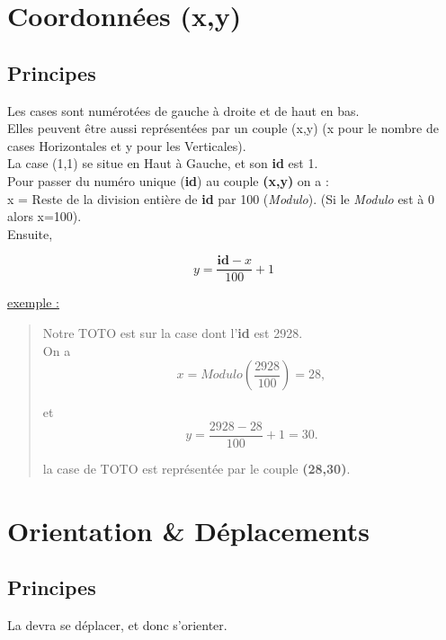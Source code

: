 \documentclass[french]{report}
\newlength{\du}\fi
\begin{document}
\section{Coordonnées (x,y)}\label{coordonnees}

\subsection{Principes}
Les cases sont numérotées de gauche à droite et de haut en bas.\\

Elles peuvent être aussi représentées par un couple (x,y) (x pour le nombre de cases Horizontales et y pour les Verticales).\\
La case (1,1) se situe en Haut à Gauche, et son \textbf{id} est 1.\\

Pour passer du numéro unique (\textbf{id}) au couple \textbf{(x,y)} on a :\\

x = Reste de la division entière de \textbf{id} par 100 (\textit{Modulo}). (Si le \textit{Modulo} est à 0 alors  x=100).\\

Ensuite,

\begin{equation}
y = \frac{\textbf{id} - x}{100} + 1
\end{equation}

\underline{exemple :} \\
\begin{quote}
	Notre \CoCiX TOTO est sur la case dont l'\textbf{id} est 2928.\\
	
	On a \[ x = Modulo(\frac{2928}{100}) = 28,\]
	
	et \[ y =  \frac{2928 - 28}{100} + 1  = 30.\]
	
	la case de TOTO est représentée par le couple \textbf{(28,30)}.
	
\end{quote}

\section{Orientation \& Déplacements}\label{orientation}
\subsection{Principes}
La \CoCiX devra se déplacer, et donc s'orienter.\\
\end{document}
